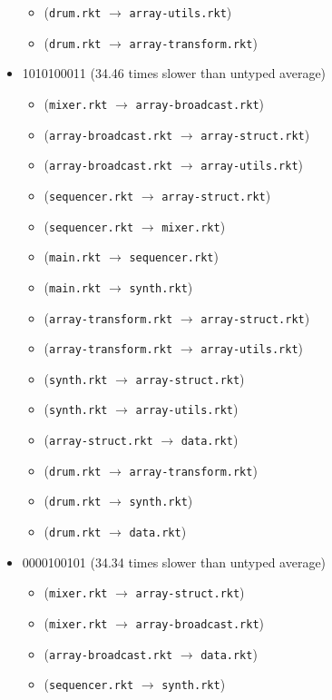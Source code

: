\documentclass{article}
\newcommand{\mono}[1]{\texttt{#1}}
\begin{document}
\begin{itemize}
\begin{itemize}
  \item (\mono{drum.rkt} $\rightarrow$ \mono{array-utils.rkt})
  \item (\mono{drum.rkt} $\rightarrow$ \mono{array-transform.rkt})
  \end{itemize}
\item 1010100011 (34.46 times slower than untyped average)
  \begin{itemize}
  \item (\mono{mixer.rkt} $\rightarrow$ \mono{array-broadcast.rkt})
  \item (\mono{array-broadcast.rkt} $\rightarrow$ \mono{array-struct.rkt})
  \item (\mono{array-broadcast.rkt} $\rightarrow$ \mono{array-utils.rkt})
  \item (\mono{sequencer.rkt} $\rightarrow$ \mono{array-struct.rkt})
  \item (\mono{sequencer.rkt} $\rightarrow$ \mono{mixer.rkt})
  \item (\mono{main.rkt} $\rightarrow$ \mono{sequencer.rkt})
  \item (\mono{main.rkt} $\rightarrow$ \mono{synth.rkt})
  \item (\mono{array-transform.rkt} $\rightarrow$ \mono{array-struct.rkt})
  \item (\mono{array-transform.rkt} $\rightarrow$ \mono{array-utils.rkt})
  \item (\mono{synth.rkt} $\rightarrow$ \mono{array-struct.rkt})
  \item (\mono{synth.rkt} $\rightarrow$ \mono{array-utils.rkt})
  \item (\mono{array-struct.rkt} $\rightarrow$ \mono{data.rkt})
  \item (\mono{drum.rkt} $\rightarrow$ \mono{array-transform.rkt})
  \item (\mono{drum.rkt} $\rightarrow$ \mono{synth.rkt})
  \item (\mono{drum.rkt} $\rightarrow$ \mono{data.rkt})
  \end{itemize}
\item 0000100101 (34.34 times slower than untyped average)
  \begin{itemize}
  \item (\mono{mixer.rkt} $\rightarrow$ \mono{array-struct.rkt})
  \item (\mono{mixer.rkt} $\rightarrow$ \mono{array-broadcast.rkt})
  \item (\mono{array-broadcast.rkt} $\rightarrow$ \mono{data.rkt})
  \item (\mono{sequencer.rkt} $\rightarrow$ \mono{synth.rkt})

\end{itemize}
\end{itemize}
\end{document}
